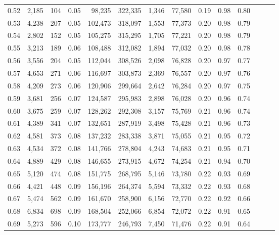 \begin{tabular}{rrrrrrrrrrrrrr}
0.52 &   2,185 &    104 &  0.05 &   98,235 &  322,335 &   1,346 &  77,580 &  0.19 &  0.98 &      0.80 \\
0.53 &   4,238 &    207 &  0.05 &  102,473 &  318,097 &   1,553 &  77,373 &  0.20 &  0.98 &      0.79 \\
0.54 &   2,802 &    152 &  0.05 &  105,275 &  315,295 &   1,705 &  77,221 &  0.20 &  0.98 &      0.79 \\
0.55 &   3,213 &    189 &  0.06 &  108,488 &  312,082 &   1,894 &  77,032 &  0.20 &  0.98 &      0.78 \\
0.56 &   3,556 &    204 &  0.05 &  112,044 &  308,526 &   2,098 &  76,828 &  0.20 &  0.97 &      0.77 \\
0.57 &   4,653 &    271 &  0.06 &  116,697 &  303,873 &   2,369 &  76,557 &  0.20 &  0.97 &      0.76 \\
0.58 &   4,209 &    273 &  0.06 &  120,906 &  299,664 &   2,642 &  76,284 &  0.20 &  0.97 &      0.75 \\
0.59 &   3,681 &    256 &  0.07 &  124,587 &  295,983 &   2,898 &  76,028 &  0.20 &  0.96 &      0.74 \\
0.60 &   3,675 &    259 &  0.07 &  128,262 &  292,308 &   3,157 &  75,769 &  0.21 &  0.96 &      0.74 \\
0.61 &   4,389 &    341 &  0.07 &  132,651 &  287,919 &   3,498 &  75,428 &  0.21 &  0.96 &      0.73 \\
0.62 &   4,581 &    373 &  0.08 &  137,232 &  283,338 &   3,871 &  75,055 &  0.21 &  0.95 &      0.72 \\
0.63 &   4,534 &    372 &  0.08 &  141,766 &  278,804 &   4,243 &  74,683 &  0.21 &  0.95 &      0.71 \\
0.64 &   4,889 &    429 &  0.08 &  146,655 &  273,915 &   4,672 &  74,254 &  0.21 &  0.94 &      0.70 \\
0.65 &   5,120 &    474 &  0.08 &  151,775 &  268,795 &   5,146 &  73,780 &  0.22 &  0.93 &      0.69 \\
0.66 &   4,421 &    448 &  0.09 &  156,196 &  264,374 &   5,594 &  73,332 &  0.22 &  0.93 &      0.68 \\
0.67 &   5,474 &    562 &  0.09 &  161,670 &  258,900 &   6,156 &  72,770 &  0.22 &  0.92 &      0.66 \\
0.68 &   6,834 &    698 &  0.09 &  168,504 &  252,066 &   6,854 &  72,072 &  0.22 &  0.91 &      0.65 \\
0.69 &   5,273 &    596 &  0.10 &  173,777 &  246,793 &   7,450 &  71,476 &  0.22 &  0.91 &      0.64 \\

\end{tabular}

